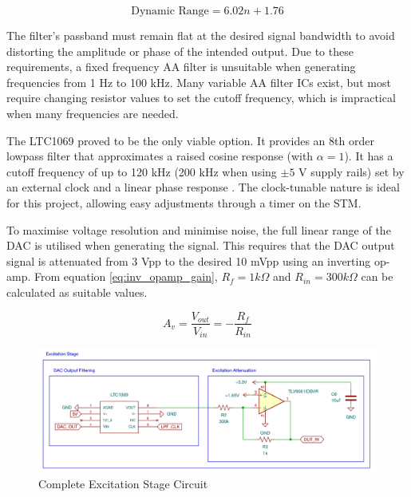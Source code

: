 \begin{equation}
    \text{Dynamic Range} = 6.02n + 1.76 
    \label{eq:dac_range}
\end{equation}

The filter's passband must remain flat at the desired signal bandwidth to avoid distorting the amplitude or phase of the intended output. Due to these requirements, a fixed frequency AA filter is unsuitable when generating frequencies from 1 Hz to 100 kHz. Many variable AA filter ICs exist, but most require changing resistor values to set the cutoff frequency, which is impractical when many frequencies are needed. 

The LTC1069 proved to be the only viable option. It provides an 8th order lowpass filter that approximates a raised cosine response (with $\alpha=1$). It has a cutoff frequency of up to 120 kHz (200 kHz when using $\pm5$ V supply rails) set by an external clock and a linear phase response \cite{LTC10697CS8PBF}. The clock-tunable nature is ideal for this project, allowing easy adjustments through a timer on the STM.

To maximise voltage resolution and minimise noise, the full linear range of the \ac{DAC} is utilised when generating the signal. This requires that the \ac{DAC} output signal is attenuated from 3 Vpp to the desired 10 mVpp using an inverting op-amp. From equation \ref{eq:inv_opamp_gain}, $R_{f}=1 k\Omega$ and $R_{in}=300 k\Omega$ can be calculated as suitable values.

\begin{equation}
    A_v = \frac{V_{out}}{V_{in}} = -\frac{R_f}{R_{in}}
    \label{eq:inv_opamp_gain}
\end{equation}

\begin{figure}[]
    \centering
    \includegraphics[width=\textwidth]{ExcitationSchem.png}
    \caption{Complete Excitation Stage Circuit}
    \label{fig:excitation_stage_circuit}
\end{figure}

